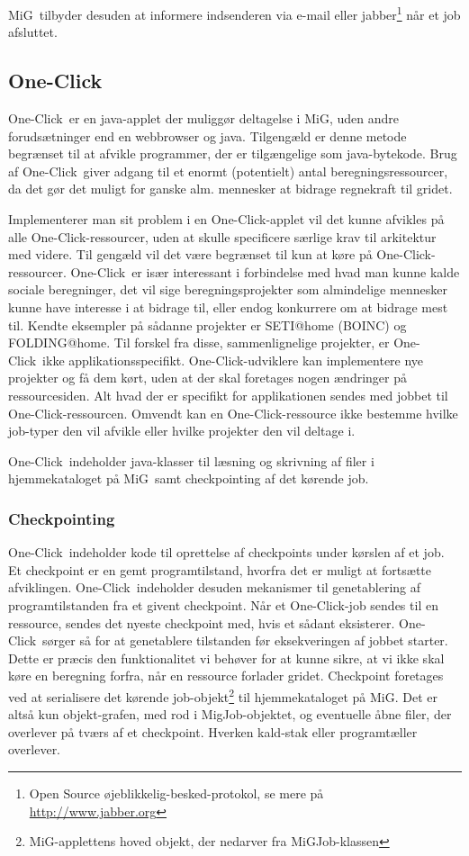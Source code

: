 \documentclass[final,a4paper,11pt]{article}
\newcommand{\mig}{MiG}
\newcommand{\oc}{One-Click}
\begin{document}
\mig\ tilbyder desuden at informere indsenderen via e-mail eller jabber\footnote{Open Source øjeblikkelig-besked-protokol, se mere på \url{http://www.jabber.org}} når et job afsluttet. 

\subsection{\oc} \label{oneclick}
\oc\ er en java-applet der muliggør deltagelse i \mig, uden andre forudsætninger end en webbrowser og java. Tilgengæld er denne metode begrænset til at afvikle programmer, der er tilgængelige som java-bytekode. Brug af \oc\ giver adgang til et enormt (potentielt) antal beregningsressourcer, da det gør det muligt for ganske alm. mennesker at bidrage regnekraft til gridet.

Implementerer man sit problem i en \oc-applet vil det kunne afvikles på alle \oc-ressourcer, uden at skulle specificere særlige krav til arkitektur med videre. Til gengæld vil det være begrænset til kun at køre på \oc-ressourcer.
\oc\ er især interessant i forbindelse med hvad man kunne kalde sociale beregninger, det vil sige beregningsprojekter som almindelige mennesker kunne have interesse i at bidrage til, eller endog konkurrere om at bidrage mest til. Kendte eksempler på sådanne projekter er SETI@home (BOINC) og FOLDING@home. Til forskel fra disse, sammenlignelige projekter, er \oc\ ikke applikationsspecifikt. \oc-udviklere kan implementere nye projekter og få dem kørt, uden at der skal foretages nogen ændringer på ressourcesiden. Alt hvad der er specifikt for applikationen sendes med jobbet til \oc-ressourcen. Omvendt kan en \oc-ressource ikke bestemme hvilke job-typer den vil afvikle eller hvilke projekter den vil deltage i.

\oc\ indeholder java-klasser til læsning og skrivning af filer i hjemmekataloget på \mig\, samt checkpointing af det kørende job. 

\subsubsection{Checkpointing}
\oc\ indeholder kode til oprettelse af checkpoints under kørslen af et job. Et checkpoint er en gemt programtilstand, hvorfra det er muligt at fortsætte afviklingen. \oc\ indeholder desuden mekanismer til genetablering af programtilstanden fra et givent checkpoint. Når et \oc-job sendes til en ressource, sendes det nyeste checkpoint med, hvis et sådant eksisterer. \oc\ sørger så for at genetablere tilstanden før eksekveringen af jobbet starter. Dette er præcis den funktionalitet vi behøver for at kunne sikre, at vi ikke skal køre en beregning forfra, når en ressource forlader gridet.
Checkpoint foretages ved at serialisere det kørende job-objekt\footnote{\mig-applettens hoved objekt, der nedarver fra MiGJob-klassen} til hjemmekataloget på \mig. Det er altså kun objekt-grafen, med rod i MigJob-objektet, og eventuelle åbne filer, der overlever på tværs af et checkpoint. Hverken kald-stak eller programtæller overlever.
\end{document}
